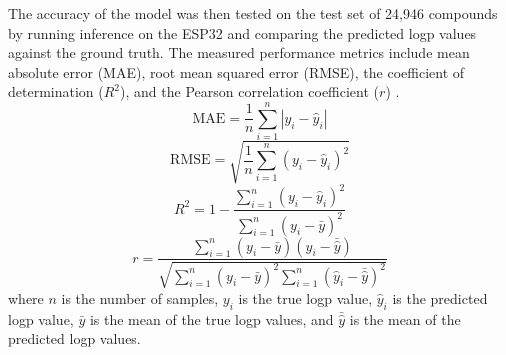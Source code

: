 The accuracy of the model was then tested on the test set of 24,946 compounds by running inference on the ESP32 and comparing the predicted \gls{logp} values against the ground truth.
The measured performance metrics include mean absolute error (MAE), root mean squared error (RMSE), the coefficient of determination ($R^2$), and the Pearson correlation coefficient ($r$) \cite{pearson}.
\begin{equation}
    \mathrm{MAE} = \frac{1}{n} \sum_{i=1}^{n} |y_i - \hat{y}_i|
\end{equation}
\begin{equation}
    \mathrm{RMSE} = \sqrt{\frac{1}{n} \sum_{i=1}^{n} (y_i - \hat{y}_i)^2}
\end{equation}
\begin{equation}
    R^2 = 1 - \frac{\sum_{i=1}^{n} (y_i - \hat{y}_i)^2}{\sum_{i=1}^{n} (y_i - \bar{y})^2}
\end{equation}
\begin{equation}
    r = \frac{\sum_{i=1}^{n} (y_i - \bar{y})(\hat{y}_i - \bar{\hat{y}})}{\sqrt{\sum_{i=1}^{n} (y_i - \bar{y})^2 \sum_{i=1}^{n} (\hat{y}_i - \bar{\hat{y}})^2}}
\end{equation}
where $n$ is the number of samples, $y_i$ is the true \gls{logp} value, $\hat{y}_i$ is the predicted \gls{logp} value, $\bar{y}$ is the mean of the true \gls{logp} values, and $\bar{\hat{y}}$ is the mean of the predicted \gls{logp} values.
